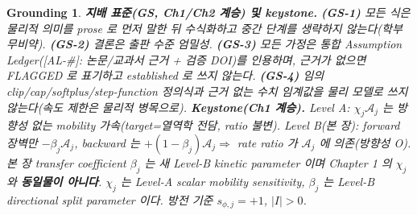 \documentclass[11pt,a4paper]{article}
\newtheorem*{groundingbox}{Grounding}
\newcommand{\AL}[1]{\textsf{[AL-#1]}}
\begin{document}
\begin{groundingbox}
\textbf{지배 표준(GS, Ch1/Ch2 계승) 및 keystone.} \textbf{(GS-1)} 모든 식은 물리적 의미를 prose 로 먼저 말한 뒤
수식화하고 중간 단계를 생략하지 않는다(학부 무비약). \textbf{(GS-2)} 결론은 출판 수준 엄밀성. \textbf{(GS-3)} 모든
가정은 통합 Assumption Ledger(\AL{\#}: 논문/교과서 근거 + 검증 DOI)를 인용하며, 근거가 없으면 FLAGGED 로
표기하고 established 로 쓰지 않는다. \textbf{(GS-4)} 임의 clip/cap/softplus/step-function 정의식과 근거 없는
수치 임계값을 물리 모델로 쓰지 않는다(속도 제한은 물리적 병목으로). \textbf{Keystone(Ch1 계승).} Level A:
$\chi_j\mathcal A_j$ 는 \emph{방향성 없는} mobility 가속(target=열역학 전담, ratio 불변). Level B(본 장):
forward 장벽만 $-\beta_j\mathcal A_j$, backward 는 $+(1-\beta_j)\mathcal A_j\Rightarrow$ rate ratio 가
$\mathcal A_j$ 에 의존(방향성 O). 본 장 transfer coefficient $\beta_j$ 는 새 Level-B kinetic parameter 이며
Chapter 1 의 $\chi_j$ 와 \textbf{동일물이 아니다}. $\chi_j$ 는 Level-A scalar mobility sensitivity, $\beta_j$ 는
Level-B directional split parameter 이다. 방전 기준 $s_{\phi,j}=+1$, $|I|>0$.
\end{groundingbox}

\tableofcontents
\newpage

\end{document}
